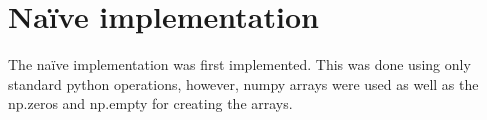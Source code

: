 \section{Na\"ive implementation}
The na\"ive implementation was first implemented. This was done using only standard python operations, however, numpy arrays were used as well as the np.zeros and np.empty for creating the arrays. 